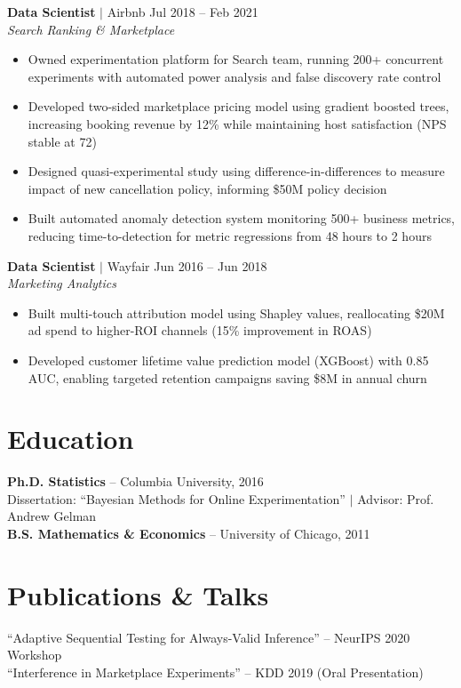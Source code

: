 \documentclass[10pt,letterpaper]{article}
\begin{document}
\textbf{Data Scientist} $\mid$ Airbnb \hfill {\small\color{accent} Jul 2018 -- Feb 2021}\\
{\footnotesize\itshape Search Ranking \& Marketplace}
\begin{itemize}
    \item Owned experimentation platform for Search team, running 200+ concurrent experiments with automated power analysis and false discovery rate control
    \item Developed two-sided marketplace pricing model using gradient boosted trees, increasing booking revenue by 12\% while maintaining host satisfaction (NPS stable at 72)
    \item Designed quasi-experimental study using difference-in-differences to measure impact of new cancellation policy, informing \$50M policy decision
    \item Built automated anomaly detection system monitoring 500+ business metrics, reducing time-to-detection for metric regressions from 48 hours to 2 hours
\end{itemize}

\textbf{Data Scientist} $\mid$ Wayfair \hfill {\small\color{accent} Jun 2016 -- Jun 2018}\\
{\footnotesize\itshape Marketing Analytics}
\begin{itemize}
    \item Built multi-touch attribution model using Shapley values, reallocating \$20M ad spend to higher-ROI channels (15\% improvement in ROAS)
    \item Developed customer lifetime value prediction model (XGBoost) with 0.85 AUC, enabling targeted retention campaigns saving \$8M in annual churn
\end{itemize}

\section{Education}

\textbf{Ph.D. Statistics} -- Columbia University, 2016\\
{\footnotesize Dissertation: ``Bayesian Methods for Online Experimentation'' $\mid$ Advisor: Prof. Andrew Gelman}\\[2pt]
\textbf{B.S. Mathematics \& Economics} -- University of Chicago, 2011

\section{Publications \& Talks}

{\small ``Adaptive Sequential Testing for Always-Valid Inference'' -- NeurIPS 2020 Workshop\\
``Interference in Marketplace Experiments'' -- KDD 2019 (Oral Presentation)}
\end{document}
